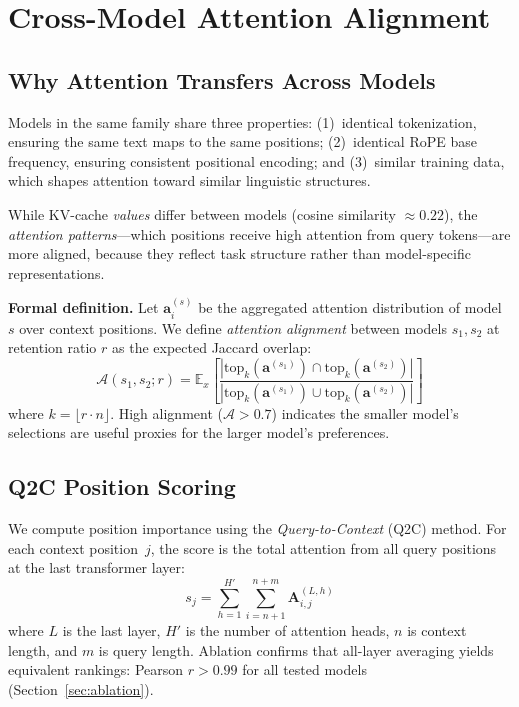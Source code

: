 \documentclass{article}
\newcommand{\QtoC}{\textsc{Q2C}\xspace}
\newcommand{\bA}{\mathbf{A}}
\begin{document}
\section{Cross-Model Attention Alignment}
\label{sec:attention}

\subsection{Why Attention Transfers Across Models}

Models in the same family share three properties: (1)~identical tokenization, ensuring the same text maps to the same positions; (2)~identical RoPE base frequency, ensuring consistent positional encoding; and (3)~similar training data, which shapes attention toward similar linguistic structures.

While KV-cache \emph{values} differ between models (cosine similarity $\approx 0.22$), the \emph{attention patterns}---which positions receive high attention from query tokens---are more aligned, because they reflect task structure rather than model-specific representations.

\textbf{Formal definition.}
Let $\mathbf{a}_i^{(s)}$ be the aggregated attention distribution of model~$s$ over context positions.
We define \emph{attention alignment} between models $s_1, s_2$ at retention ratio $r$ as the expected Jaccard overlap:
\begin{equation}
    \mathcal{A}(s_1, s_2; r) = \mathbb{E}_{x}\left[\frac{|\text{top}_k(\mathbf{a}^{(s_1)}) \cap \text{top}_k(\mathbf{a}^{(s_2)})|}{|\text{top}_k(\mathbf{a}^{(s_1)}) \cup \text{top}_k(\mathbf{a}^{(s_2)})|}\right]
\end{equation}
where $k = \lfloor r \cdot n \rfloor$.
High alignment ($\mathcal{A} > 0.7$) indicates the smaller model's selections are useful proxies for the larger model's preferences.

\subsection{Q2C Position Scoring}

We compute position importance using the \emph{Query-to-Context} (\QtoC) method.
For each context position~$j$, the score is the total attention from all query positions at the last transformer layer:
\begin{equation}
    s_j = \sum_{h=1}^{H'} \sum_{i=n+1}^{n+m} \bA^{(L,h)}_{i,j}
    \label{eq:q2c_score}
\end{equation}
where $L$ is the last layer, $H'$ is the number of attention heads, $n$ is context length, and $m$ is query length.
Ablation confirms that all-layer averaging yields equivalent rankings: Pearson $r > 0.99$ for all tested models (Section~\ref{sec:ablation}).
\end{document}
